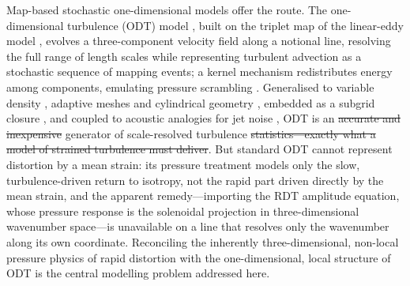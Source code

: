 \documentclass[lineno]{JFM-FLM_Au}
\providecommand{\DIFadd}[1]{{\protect\color{blue}\uwave{#1}}} %
\providecommand{\DIFdel}[1]{{\protect\color{red}\sout{#1}}} %
\providecommand{\DIFaddbegin}{} %
\providecommand{\DIFaddend}{} %
\providecommand{\DIFdelbegin}{} %
\providecommand{\DIFdelend}{} %
\begin{document}
Map-based stochastic one-dimensional models offer the route. The
one-dimensional turbulence (ODT) model
\citep{Kerstein1999,Kerstein2001}, built on the triplet map of the
linear-eddy model \citep{Kerstein1991}, evolves a three-component
velocity field along a notional line, resolving the full range of length
scales while representing turbulent advection as a stochastic sequence
of mapping events; a kernel mechanism redistributes energy among
components, emulating pressure scrambling
\citep{WunschKerstein2001,Kerstein2001}. Generalised to variable density
\citep{AshurstKerstein2005}, adaptive meshes \citep{Lignell2013,
StephensLignell2021} and cylindrical geometry \citep{Lignell2018},
embedded as a subgrid closure \citep{SchmidtKerstein2010}, and coupled
to acoustic analogies for jet noise
\citep{SharmaKleinSchmidt2022,MedinaMendez2023}, ODT is an \DIFdelbegin \DIFdel{accurate and
inexpensive }\DIFdelend \DIFaddbegin \DIFadd{established, low-cost }\DIFaddend generator of scale-resolved turbulence \DIFdelbegin \DIFdel{statistics---exactly
what a model of strained turbulence must deliver}\DIFdelend \DIFaddbegin \DIFadd{statistics}\DIFaddend . But standard ODT
cannot represent distortion by a mean strain: its pressure treatment
models only the slow, turbulence-driven return to isotropy, not the
rapid part driven directly by the mean strain, and the
apparent remedy---importing the RDT amplitude equation, whose pressure
response is the solenoidal projection in three-dimensional wavenumber
space---is unavailable on a line that resolves only the wavenumber along
its own coordinate. Reconciling the inherently three-dimensional,
non-local pressure physics of rapid distortion with the one-dimensional,
local structure of ODT is the central modelling problem addressed here.
\end{document}
